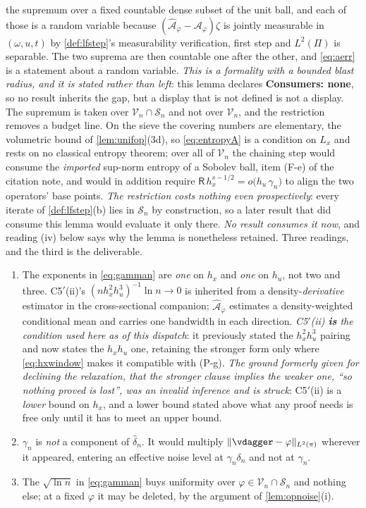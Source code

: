 \begin{lemma}
the supremum over a fixed countable dense subset of the unit ball, and each of those is a random variable
because $(\hat{\mathcal A}_\varphi-\mathcal A_\varphi)\zeta$ is jointly measurable in $(\omega,u,t)$ by
\cref{def:lfstep}'s measurability verification, first step and $L^{2}(\Pi)$ is separable. The two suprema are then countable
one after the other, and \eqref{eq:aerr} is a statement about a random variable. \emph{This is a
formality with a bounded blast radius, and it is stated rather than left}: this lemma declares
\textbf{Consumers: none}, so no result inherits the gap, but a display that is not defined is not a
display.
The supremum is taken over $\mathcal V_n\cap\mathcal S_n$ and not over $\mathcal V_n$, and the
restriction removes a budget line. On the sieve the covering numbers are elementary, the volumetric
bound of \cref{lem:unifop}(3d), so \eqref{eq:entropyA} is a condition on $L_x$ and rests on no
classical entropy theorem; over all of $\mathcal V_n$ the chaining step would consume the
\emph{imported} sup-norm entropy of a Sobolev ball, item (F-e) of the citation note, and would in
addition require $\mathsf R\,h_x^{s-1/2}=o\big(h_u\,\gamma_n\big)$ to align the two operators' base
points. \emph{The
restriction costs nothing even prospectively}: every iterate of \cref{def:lfstep}(b) lies in
$\mathcal S_n$ by construction, so a later result that did consume this lemma would evaluate it only
there. \emph{No result consumes it now}, and reading (iv) below says why the lemma is nonetheless
retained.
Three readings, and the third is the deliverable.
\begin{enumerate}
\item[(i)] The exponents in \eqref{eq:gamman} are \emph{one} on $h_x$ and \emph{one} on $h_u$, not two
and three. C5$'$(ii)'s $(n h_x^{2}h_u^{3})^{-1}\ln n\to0$ is inherited from a density-\emph{derivative}
estimator in the cross-sectional companion; $\hat{\mathcal A}_\varphi$ estimates a density-weighted
conditional mean and carries one bandwidth in each direction. \emph{C5$'$(ii) \textbf{is} the condition
used here as of this dispatch}: it previously stated the $h_x^{2}h_u^{3}$ pairing and now states the
$h_xh_u$ one, retaining the stronger form only where \eqref{eq:hxwindow} makes it compatible with (P-g).
\emph{The ground formerly given for declining the relaxation, that the stronger clause implies the
weaker one, ``so nothing proved is lost'', was an invalid inference and is struck}: C5$'$(ii) is a
\emph{lower} bound on $h_x$, and a lower bound stated above what any proof needs is free only until it has
to meet an upper bound.
\item[(ii)] $\gamma_n$ is \emph{not} a component of $\hat\delta_n$. It would multiply
$\|\vdagger-\varphi\|_{L^{2}(\pi)}$ wherever it appeared, entering an effective noise level at
$\gamma_n\delta_n$ and not at $\gamma_n$.
\item[(iii)] The $\sqrt{\ln n}$ in \eqref{eq:gamman} buys uniformity over
$\varphi\in\mathcal V_n\cap\mathcal S_n$ and nothing else; at a fixed $\varphi$ it may be deleted, by
the argument of \cref{lem:opnoise}(i).
\end{enumerate}


\end{lemma}
